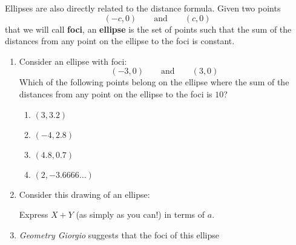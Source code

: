 \documentclass[nooutcomes,noauthor,handout]{ximera}
\begin{document}
\begin{question}
  Ellipses are also directly related to the distance formula.  Given
  two points
  \[
  (-c,0) \qquad\text{and} \qquad (c,0)
  \]
  that we will call \textbf{foci}, an \textbf{ellipse} is the set
  of points such that the sum of the distances from any point on
  the ellipse to the foci is constant.
  \begin{enumerate}      
  \item Consider an ellipse with foci:
    \[
    (-3,0) \qquad \text{and}\qquad (3,0)
    \]%
    Which of the following points belong on the ellipse where the sum
    of the distances from any point on the ellipse to the foci is
    $10$?
    \begin{enumerate}
    \item $(3,3.2)$ %
    \item $(-4,2.8)$ %
    \item $(4.8,0.7)$ %
    \item $(2,-3.6666\dots)$ %
    \end{enumerate}
    \item Consider this drawing of an ellipse:
      \begin{center}
      \end{center}
      Express $X+Y$ (as simply as you can!) in terms of $a$.
    \item \textit{Geometry Giorgio} suggests that the foci of this ellipse
      \begin{center}
\end{center}
\end{enumerate}
\end{question}
\end{document}
